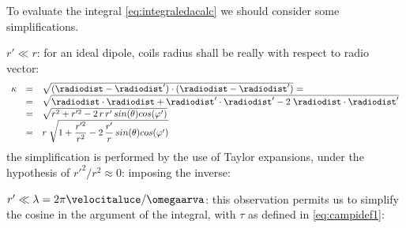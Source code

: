 To evaluate the integral \ref{eq:integraledacalc}  we should consider some simplifications.

$r' \ll r$: for an ideal dipole, coils radius shall be really with respect to radio vector:
\[
\begin{array}{rcl}
\kappa & = & \sqrt{(\radiodist - \radiodist') \cdot (\radiodist - \radiodist')} = \\
 & = & \sqrt{\radiodist \cdot \radiodist + \radiodist' \cdot \radiodist' - 2\; \radiodist \cdot \radiodist'} \\
 & = & \sqrt{r^2 + r'^2 - 2\,r\,r'\,sin(\theta)cos(\varphi')} \\
 & = & r\;\sqrt{1 + \dfrac{r'^2}{r^2} - 2\,\dfrac{r'}{r}\,sin(\theta)cos(\varphi')}
\end{array}
\]
the simplification is performed by the use of Taylor expansions, under the hypothesis of $r'^2/r^2 \approx 0$:
imposing the inverse:

$r' \ll \lambda = 2\pi\velocitaluce/\omegaarva$: this observation permits us to simplify the cosine in the argument of the integral, with $\tau$ as defined in \ref{eq:campidef1}:

